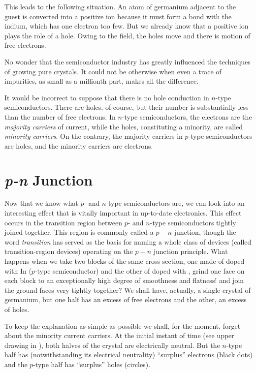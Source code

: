 This leads to the following situation. An atom of germanium adjacent to the guest is converted into a positive ion because it must form a bond with the indium, which has one electron too few. But we already know that a positive ion plays the role of a hole. Owing to the field, the holes move and there is motion of free electrons.

No wonder that the semiconductor industry has greatly influenced the techniques of growing pure crystals. It could not be otherwise when even a trace of impurities,
as small as a millionth part, makes all the difference. 

It would be incorrect to suppose that there is no hole conduction in $n$-type semiconductors. There are holes, of course, but their number is substantially less than the number of free electrons. In $n$-type semiconductors, the electrons are the \emph{majority carriers} of current, while the holes, constituting a minority, are called \emph{minority carriers}. On the contrary, the majority carriers in $p$-type semiconductors are holes, and the minority carriers are electrons.

\section{\emph{p-n} Junction}

Now that we know what $p$- and $n$-type semiconductors are, we can look into an interesting effect that is vitally important in up-to-date electronics. This effect occurs in the transition region between $p$- and $n$-type semiconductors tightly joined together. This region is commonly called a $p\!-\!n$ junction, though the word \emph{transition} has served as the basis for naming a whole class of devices (called transition-region devices) operating on the $p\!-\!n$ junction principle. What happens when we take two blocks of the same cross section, one made of  doped with In ($p$-type semiconductor) and the other of  doped with , grind one face on each block to an exceptionally high degree of smoothness and flatness! and join the ground faces very tightly together? We shall have, actually, a single crystal of germanium, but one half has an excess of free electrons and the other, an excess of holes.


To keep the explanation as simple as possible we shall, for the moment, forget about the minority current carriers. At the initial instant of time (see upper drawing in ), both halves of the crystal are electrically neutral. But the $n$-type half has (notwithstanding its electrical neutrality) ``surplus'' electrons (black dots) and the $p$-type half has ``surplus'' holes (circles).


